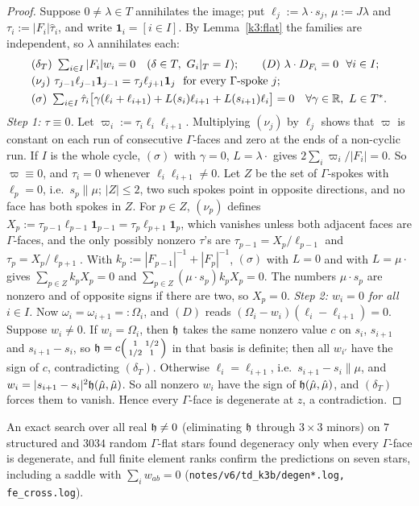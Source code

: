 \begin{proof}
Suppose $0\ne\lambda\in T$ annihilates the image; put $\ell_j:=\lambda\cdot s_j$, $\mu:=J\lambda$ and $\tau_i:=|F_i|\hat\tau_i$, and write $\mathbf 1_i=[i\in I]$. By Lemma~\ref{k3:flat} the families are independent, so $\lambda$ annihilates each:
\begin{align*}
&(\delta_T)\ \textstyle\sum_{i\in I}|F_i|w_i=0\quad(\delta\in T,\ G_i|_T=I);\qquad(D)\ \lambda\cdot D_{F_i}=0\ \ \forall i\in I;\\
&(\nu_j)\ \tau_{j-1}\ell_{j-1}\mathbf 1_{j-1}=\tau_j\ell_{j+1}\mathbf 1_j\ \text{ for every $\Gamma$-spoke $j$};\\
&(\sigma)\ \textstyle\sum_{i\in I}\hat\tau_i\bigl[\gamma(\ell_i+\ell_{i+1})+L(s_i)\ell_{i+1}+L(s_{i+1})\ell_i\bigr]=0\quad\forall\gamma\in\R,\ L\in T^\ast .
\end{align*}
\emph{Step 1: $\tau\equiv0$.} Let $\varpi_i:=\tau_i\ell_i\ell_{i+1}$. Multiplying $(\nu_j)$ by $\ell_j$ shows that $\varpi$ is constant on each run of consecutive $\Gamma$-faces and zero at the ends of a non-cyclic run. If $I$ is the whole cycle, $(\sigma)$ with $\gamma=0$, $L=\lambda\cdot$ gives $2\sum_i\varpi_i/|F_i|=0$. So $\varpi\equiv0$, and $\tau_i=0$ whenever $\ell_i\ell_{i+1}\ne0$. Let $Z$ be the set of $\Gamma$-spokes with $\ell_p=0$, i.e.\ $s_p\parallel\mu$; $|Z|\le2$, two such spokes point in opposite directions, and no face has both spokes in $Z$. For $p\in Z$, $(\nu_p)$ defines $X_p:=\tau_{p-1}\ell_{p-1}\mathbf 1_{p-1}=\tau_p\ell_{p+1}\mathbf 1_p$, which vanishes unless both adjacent faces are $\Gamma$-faces, and the only possibly nonzero $\tau$'s are $\tau_{p-1}=X_p/\ell_{p-1}$ and $\tau_p=X_p/\ell_{p+1}$. With $k_p:=|F_{p-1}|^{-1}+|F_p|^{-1}$, $(\sigma)$ with $L=0$ and with $L=\mu\cdot$ gives $\sum_{p\in Z}k_pX_p=0$ and $\sum_{p\in Z}(\mu\cdot s_p)k_pX_p=0$. The numbers $\mu\cdot s_p$ are nonzero and of opposite signs if there are two, so $X_p=0$.
\emph{Step 2: $w_i=0$ for all $i\in I$.} Now $\omega_i=\omega_{i+1}=:\Omega_i$, and $(D)$ reads $(\Omega_i-w_i)(\ell_i-\ell_{i+1})=0$. Suppose $w_i\ne0$. If $w_i=\Omega_i$, then $\mathfrak h$ takes the same nonzero value $c$ on $s_i$, $s_{i+1}$ and $s_{i+1}-s_i$, so $\mathfrak h=c\begin{psmallmatrix}1&1/2\\1/2&1\end{psmallmatrix}$ in that basis is definite; then all $w_{i'}$ have the sign of $c$, contradicting $(\delta_T)$. Otherwise $\ell_i=\ell_{i+1}$, i.e.\ $s_{i+1}-s_i\parallel\mu$, and $w_i=|s_{i+1}-s_i|^2\mathfrak h(\hat\mu,\hat\mu)$. So all nonzero $w_i$ have the sign of $\mathfrak h(\hat\mu,\hat\mu)$, and $(\delta_T)$ forces them to vanish. Hence every $\Gamma$-face is degenerate at $z$, a contradiction.
\end{proof}
An exact search over all real $\mathfrak h\ne0$ (eliminating $\mathfrak h$ through $3\times3$ minors) on $7$ structured and $3034$ random $\Gamma$-flat stars found degeneracy only when every $\Gamma$-face is degenerate, and full finite element ranks confirm the predictions on seven stars, including a saddle with $\sum_iw_{ab}=0$ (\texttt{notes/v6/td\_k3b/degen*.log, fe\_cross.log}). 

